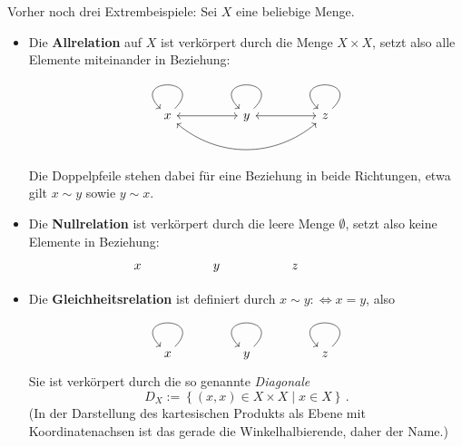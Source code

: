 \begin{de}\label{bsp:trivialrelationen}
	Vorher noch drei Extrembeispiele: Sei $X$ eine beliebige Menge.
\begin{itemize}
 \item Die \textbf{Allrelation} auf $X$ ist verkörpert durch die Menge $X\times X$, setzt also alle Elemente miteinander in Beziehung:
		\[ \begin{tikzcd}[column sep = huge]
			x \ar[loop] \ar[r,<->] \ar[rr, out=320, in=220, <->] &
			y \ar[loop] \ar[r,<->]  &
			z \ar[loop] 
		\end{tikzcd} \]
	Die Doppelpfeile stehen dabei für eine Beziehung in beide Richtungen, etwa gilt $x\sim y$ sowie $y\sim x$.
\item Die \textbf{Nullrelation} ist verkörpert durch die leere Menge $\emptyset$, setzt also keine Elemente in Beziehung:
		\[ \begin{tikzcd}[column sep = huge]
			 x &y &z &  
		\end{tikzcd} \]
\item Die \textbf{Gleichheitsrelation} ist definiert durch $x\sim y:\Leftrightarrow x=y$, also
		 \[ \begin{tikzcd}[column sep = huge]
		 	x \ar[loop] &
		 	y \ar[loop] &
		 	z \ar[loop] 
		 \end{tikzcd} \]
	Sie ist verkörpert durch die so genannte \emph{Diagonale}
		\[ D_X :=\left\{ (x,x)\in X\times X\mid x\in X \right\} \,. \]
	(In der Darstellung des kartesischen Produkts als Ebene mit Koordinatenachsen ist das gerade die Winkelhalbierende, daher der Name.)
\end{itemize}
\end{de}

